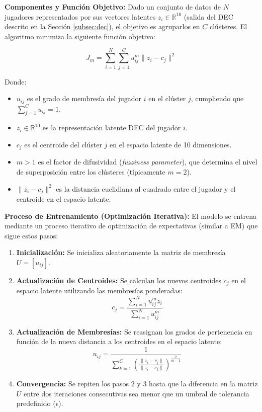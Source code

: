 \documentclass[conference]{IEEEtran}
\begin{document}
\textbf{Componentes y Función Objetivo:}
Dado un conjunto de datos de $N$ jugadores representados por sus vectores latentes $z_i \in \mathbb{R}^{10}$ (salida del DEC descrito en la Sección \ref{subsec:dec}), el objetivo es agruparlos en $C$ clústeres. El algoritmo minimiza la siguiente función objetivo:

\begin{equation}
J_m = \sum_{i=1}^{N} \sum_{j=1}^{C} u_{ij}^m \|z_i - c_j\|^2
\end{equation}

Donde:
\begin{itemize}
    \item $u_{ij}$ es el grado de membresía del jugador $i$ en el clúster $j$, cumpliendo que $\sum_{j=1}^{C} u_{ij} = 1$.
    \item $z_i \in \mathbb{R}^{10}$ es la representación latente DEC del jugador $i$.
    \item $c_j$ es el centroide del clúster $j$ en el espacio latente de 10 dimensiones.
    \item $m > 1$ es el factor de difusividad (\textit{fuzziness parameter}), que determina el nivel de superposición entre los clústeres (típicamente $m=2$).
    \item $\|z_i - c_j\|^2$ es la distancia euclidiana al cuadrado entre el jugador y el centroide en el espacio latente.
\end{itemize}

\textbf{Proceso de Entrenamiento (Optimización Iterativa):}
El modelo se entrena mediante un proceso iterativo de optimización de expectativas (similar a EM) que sigue estos pasos:
\begin{enumerate}
    \item \textbf{Inicialización:} Se inicializa aleatoriamente la matriz de membresía $U = [u_{ij}]$.
    \item \textbf{Actualización de Centroides:} Se calculan los nuevos centroides $c_j$ en el espacio latente utilizando las membresías ponderadas:
    \begin{equation}
    c_j = \frac{\sum_{i=1}^{N} u_{ij}^m z_i}{\sum_{i=1}^{N} u_{ij}^m}
    \end{equation}
    \item \textbf{Actualización de Membresías:} Se reasignan los grados de pertenencia en función de la nueva distancia a los centroides en el espacio latente:
    \begin{equation}
    u_{ij} = \frac{1}{\sum_{k=1}^{C} \left( \frac{\|z_i - c_j\|}{\|z_i - c_k\|} \right)^{\frac{2}{m-1}}}
    \end{equation}
    \item \textbf{Convergencia:} Se repiten los pasos 2 y 3 hasta que la diferencia en la matriz $U$ entre dos iteraciones consecutivas sea menor que un umbral de tolerancia predefinido ($\epsilon$).
\end{enumerate}
\end{document}
